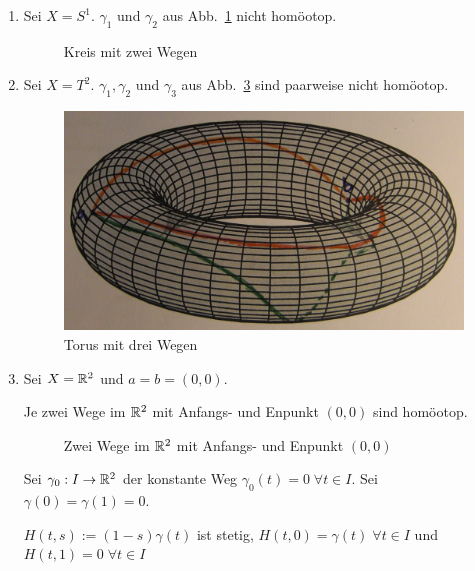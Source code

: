 \begin{beispiel}
    \begin{enumerate}[label=\arabic*)]
        \item Sei $X = S^1$. $\gamma_1$ und $\gamma_2$ aus 
              Abb.~\ref{fig:circle-two-paths} nicht homöotop.
              \begin{figure}
                \centering
                
                \caption{Kreis mit zwei Wegen}
                \label{fig:circle-two-paths}
              \end{figure}
        \item Sei $X = T^2$. $\gamma_1, \gamma_2$ und $\gamma_3$
              aus Abb.~\ref{fig:torus-three-paths} sind paarweise
              nicht homöotop.
              \begin{figure}
                \centering
                \includegraphics[width=0.5\linewidth, keepaspectratio]{figures/todo/torus-three-paths.jpg}
                \caption{Torus mit drei Wegen}
                \label{fig:torus-three-paths}
              \end{figure}
        \item Sei $X = \mathbb{R}^2$ und $a=b=(0,0)$. 

              Je zwei Wege im $\mathbb{R}^2$ mit Anfangs- und Enpunkt $(0,0)$
              sind homöotop.

              \begin{figure}
                \centering
                
                \caption{Zwei Wege im $\mathbb{R}^2$ mit Anfangs- und Enpunkt $(0,0)$}
                \label{fig:torus-three-paths}
              \end{figure}

              Sei $\gamma_0: I \rightarrow \mathbb{R}^2$ der konstante Weg
              $\gamma_0(t) = 0 \; \forall t \in I$. Sei
              $\gamma(0) = \gamma(1) = 0$.

              $H(t,s) := (1-s) \gamma(t)$ ist stetig, 
              $H(t,0) = \gamma(t)\; \forall t \in I$ und
              $H(t,1) = 0 \; \forall t \in I$
    \end{enumerate}
\end{beispiel}

